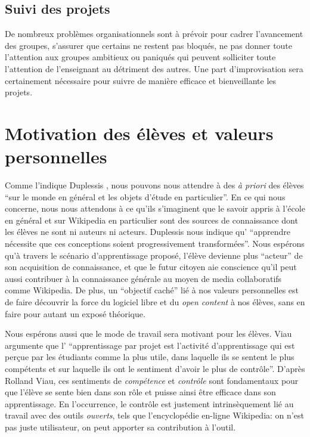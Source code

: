 \documentclass[11pt,bibliography=totoc]{scrartcl}
\begin{document}
\subsection{Suivi des projets}
De nombreux problèmes organisationnels sont à prévoir pour cadrer l'avancement des groupes, s'assurer que certains ne restent pas bloqués, ne pas donner toute l'attention aux groupes ambitieux ou paniqués qui peuvent solliciter toute l'attention de l'enseignant au détriment des autres.
Une part d'improvisation sera certainement nécessaire pour suivre de manière efficace et bienveillante les projets.
\section{Motivation des élèves et valeurs personnelles}
Comme l'indique Duplessis \cite{duplessis}, nous pouvons nous attendre à des
\textit{à priori} des élèves ``sur le monde en général et les objets d'étude en
particulier''. En ce qui nous concerne, nous nous attendons à ce qu'ils
s'imaginent que le savoir appris à l'école en général et sur Wikipedia en
particulier sont des sources de connaissance dont les élèves ne sont ni auteurs ni
acteurs. Duplessis nous indique qu' ``apprendre nécessite que ces conceptions
soient progressivement transformées''. Nous espérons qu'à travers le scénario
d'apprentissage proposé, l'élève devienne plus ``acteur'' de son acquisition de
connaissance, et que le futur citoyen aie conscience qu'il peut aussi contribuer
à la connaissance générale au moyen de media collaboratifs comme Wikipedia.
De plus, un ``objectif caché'' lié à nos valeurs personnelles est de faire
découvrir la force du logiciel libre et du \textit{open content} à nos élèves,
sans en faire pour autant un exposé théorique.
 
Nous espérons aussi que le mode de travail sera motivant pour les élèves. Viau
\cite{viau} argumente que l' ``apprentissage par projet est l'activité
d'apprentissage qui est perçue par les étudiants comme la plus utile, dans
laquelle ils se sentent le plus compétents et sur laquelle ils ont le sentiment
d'avoir le plus de contrôle''. D'après Rolland Viau, ces sentiments de
\textit{compétence} et \textit{contrôle} sont fondamentaux pour que l'élève se
sente bien dans son rôle et puisse ainsi être efficace dans son apprentissage.
En l'occurrence, le contrôle est justement intrinsèquement lié au travail avec
des outils \textit{ouverts}, tels que l'encyclopédie en-ligne Wikipedia: on
n'est pas juste utilisateur, on peut apporter sa contribution à l'outil.
\end{document}
